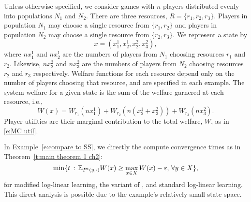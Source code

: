 Unless otherwise specified, we consider games with $n$ players distributed evenly into populations $N_1$ and $N_2$. There are three resources, $R = \{r_1,r_2,r_3\}$. Players in population $N_1$ may choose a single resource from $\{r_1,r_2\}$ and players in population $N_2$ may choose a single resource from $\{r_2,r_3\}.$ We represent a state by 
\begin{equation}x = \left(x_1^1,x_2^1,x_2^2,x_3^2\right),\label{e:states}\end{equation}
where $nx_1^1$ and $nx_2^1$ are the numbers of players from $N_1$ choosing resources $r_1$ and $r_2$.  Likewise, $nx_2^2$ and $nx_3^2$ are the numbers of players from $N_2$ choosing resources $r_2$ and $r_3$ respectively.  Welfare functions for each resource depend only on the number of players choosing that resource, and are specified in each example. The system welfare for a given state is the sum of the welfare garnered at each resource, i.e.,
\begin{equation*}
W(x) = W_{r_1}(nx_1^1) + W_{r_2}(n(x_2^1+x_2^2)) + W_{r_3}(nx_3^2).
\end{equation*}
Player utilities are their marginal contribution to the total welfare, $W$, as in \eqref{e:MC util}.


In Example~\ref{e:compare to SS}, we directly the compute convergence times as in Theorem~\ref{t:main theorem 1 ch2}: 
\begin{equation}\label{e:example conv time}
\min\{t\,:\,\mathbb{E}_{P^t(y,\cdot)}W(x)\geq \max_{x\in X} W(x) - \varepsilon,\,\forall y\in X\},
\end{equation}
for modified log-linear learning, the variant of \cite{Shah2010}, and standard log-linear learning. This direct analysis is possible due to the example's relatively small state space.




